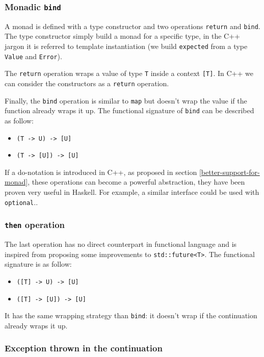 \documentclass[a4paper,10pt]{article}
\newcommand{\cpp}[1]{\lstinline{#1}}
\begin{document}
\subsubsection{Monadic \cpp{bind}}

A monad is defined with a type constructor and two operations \cpp{return} and \cpp{bind}. The type constructor simply build a monad for a specific type, in the C++ jargon it is referred to template instantiation (we build \cpp{expected} from a type \cpp{Value} and \cpp{Error}).

The \cpp{return} operation wraps a value of type \cpp{T} inside a context \cpp{[T]}. In C++ we can consider the constructors as a \cpp{return} operation.

Finally, the \cpp{bind} operation is similar to \cpp{map} but doesn't wrap the value if the function already wraps it up. The functional signature of \cpp{bind} can be described as follow:

\begin{itemize}
\item \cpp{(T -> U) -> [U]}
\item \cpp{(T -> [U]) -> [U]}
\end{itemize}

If a do-notation is introduced in C++, as proposed in section \ref{better-support-for-monad}, these operations can become a powerful abstraction, they have been proven very useful in Haskell. For example, a similar interface could be used with \cpp{optional}..

\subsubsection{\cpp{then} operation}

The last operation has no direct counterpart in functional language and is inspired from \cite{ImprovementsAsync} proposing some improvements to \cpp{std::future<T>}. The functional signature is as follow:

\begin{itemize}
\item \cpp{([T] -> U) -> [U]}
\item \cpp{([T] -> [U]) -> [U]}
\end{itemize}

It has the same wrapping strategy than \cpp{bind}: it doesn't wrap if the continuation already wraps it up.

\subsubsection{Exception thrown in the continuation}
\end{document}

